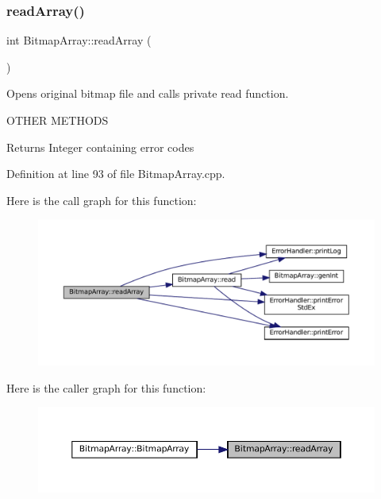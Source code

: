 \subsubsection{\texorpdfstring{readArray()}{readArray()}}
{\footnotesize\ttfamily int Bitmap\+Array\+::read\+Array (\begin{DoxyParamCaption}{ }\end{DoxyParamCaption})}



Opens original bitmap file and calls private read function. 

O\+T\+H\+ER M\+E\+T\+H\+O\+DS\begin{DoxyReturn}{Returns}
Integer containing error codes 
\end{DoxyReturn}


Definition at line 93 of file Bitmap\+Array.\+cpp.

Here is the call graph for this function\+:
\nopagebreak
\begin{figure}[H]
\begin{center}
\leavevmode
\includegraphics[width=350pt]{classBitmapArray_a4ce4b5acc896040075be63a559799e7e_cgraph}
\end{center}
\end{figure}
Here is the caller graph for this function\+:
\nopagebreak
\begin{figure}[H]
\begin{center}
\leavevmode
\includegraphics[width=350pt]{classBitmapArray_a4ce4b5acc896040075be63a559799e7e_icgraph}
\end{center}
\end{figure}
\mbox{\label{classBitmapArray_a432bda57a77788bfd54e3310c9e83c0c}} 
